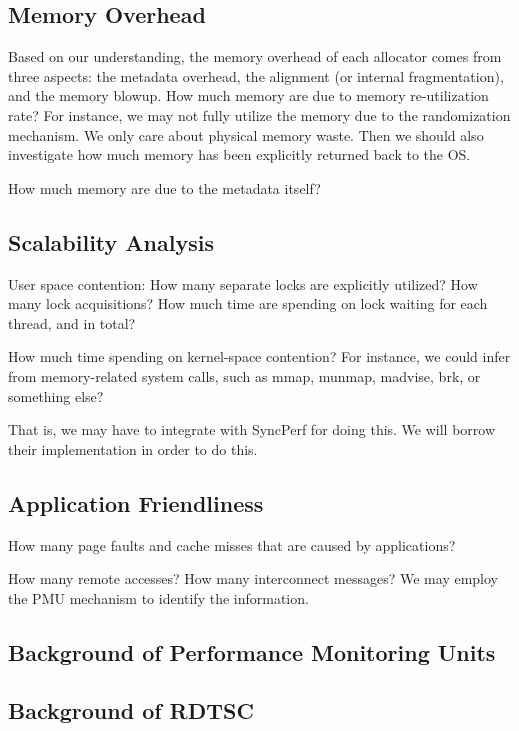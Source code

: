\begin{comment}
Can we integrate the cache misses or page faults for each allocation and deallocation, so that we could identify the issue of DieHarder that invokes many unnecessary cache misses?

If we could correlate cache misses to each thread, then we could do this. 

If allocation and deallocation takes too much time, it could be caused by multiple reasons:

(1) First, it just takes a lot of instructions (could we find out the lapsed instructions for each thread?)
(2) It may be caused by not good algorithm? 
(3) It can be caused by lock contention?
(4) It can be caused by system call related contention?
\end{comment} 

\subsection{Memory Overhead}

Based on our understanding, the memory overhead of each allocator comes from three aspects: the metadata overhead, the alignment (or internal fragmentation), and the memory blowup. 
How much memory are due to memory re-utilization rate? For instance, we may not fully utilize the memory due to the randomization mechanism. We only care about physical memory waste. Then we should also investigate how much memory has been explicitly returned back to the OS. 

How much memory are due to the metadata itself? 

\subsection{Scalability Analysis} 

User space contention:
How many separate locks are explicitly utilized? 
How many lock acquisitions? How much time are spending on lock waiting for each thread, and in total?

How much time spending on kernel-space contention? For instance, we could infer from memory-related system calls, such as mmap, munmap, madvise, brk, or something else? 

That is, we may have to integrate with SyncPerf for doing this. We will borrow their implementation in order to do this. 

\subsection{Application Friendliness} 
How many page faults and cache misses that are caused by applications? 

How many remote accesses? How many interconnect messages? We may employ the PMU mechanism to identify the information.


\subsection{Background of Performance Monitoring Units}
\label{sec:pmu}

\subsection{Background of RDTSC}

\label{sec:rdtsc}


